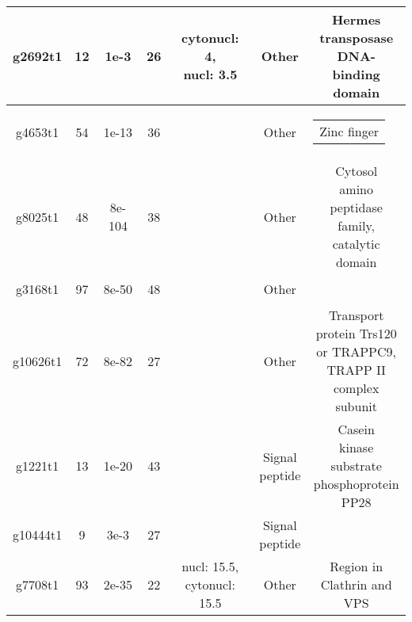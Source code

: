 \documentclass{article}
\makeatletter
\newcommand{\specialcell}[2][c]{%
	\begin{tabular}[#1]{@{}c@{}}#2\end{tabular}}
\makeatother
\begin{document}
\begin{longtable}{|c|c|c|c|c|c|c|}
   		g2692t1 & 12  &	1e-3 & 26  & \specialcell{cytonucl: 4, \\  nucl: 3.5}  & Other & \specialcell{ Hermes \\ 
   			transposase \\ 
   			DNA-binding \\ 
   			domain}  \\ 
 \hline
 	
   		g4653t1 & 54 &	1e-13 & 36  & \specialcell{ }  & Other & \specialcell{Zinc finger }  \\ 
\hline

 
 
   		g8025t1 & 48   &	8e-104 & 38  & \specialcell{  }  & Other & \specialcell{ Cytosol \\
   			amino
   			\\ peptidase \\
   			family, \\ catalytic \\
   			domain}  \\ 
 \hline
 
   		g3168t1 & 97   &	8e-50 & 48  & \specialcell{   }  & Other & \specialcell{ }  \\ 
 \hline
 
   		g10626t1 & 72  &	8e-82 & 27  & \specialcell{  }  & Other & \specialcell{ Transport \\ 
   			protein Trs120 \\ 
   			or TRAPPC9, \\
   			TRAPP II \\ 
   			complex \\ 
   			subunit}  \\ 
 \hline

    		g1221t1 & 13  &	1e-20 & 43  & \specialcell{  }  &  \specialcell{Signal \\ peptide}  & \specialcell{ Casein \\ kinase \\
    			substrate \\ 
    			phosphoprotein \\ 
    			PP28}  \\ 
 \hline
 
    		g10444t1 & 9  &	3e-3 & 27  & \specialcell{ }  &  \specialcell{Signal \\ peptide} & \specialcell{  }  \\ 
 \hline
 
 
    		g7708t1 & 93  &	2e-35 & 22  & \specialcell{ nucl: 15.5,\\ cytonucl: 15.5 }  & Other & \specialcell{ Region in \\
    			Clathrin and \\
    			VPS}  \\ 
 \hline
  

\end{longtable}
\end{document}

